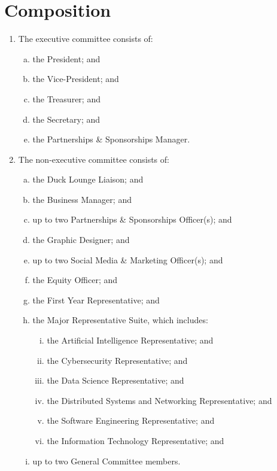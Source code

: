 \documentclass{schedule}
\begin{document}
\section{Composition}\label{composition}
\begin{enumerate}[(1)]
    \item The executive committee consists of:
          \begin{enumerate}[(a)]
              \item the President; and
              \item the Vice-President; and
              \item the Treasurer; and
              \item the Secretary; and
              \item the Partnerships \& Sponsorships Manager.
          \end{enumerate}
    \item The non-executive committee consists of:
          \begin{enumerate}[(a)]
              \item the Duck Lounge Liaison; and
              \item the Business Manager; and
              \item up to two Partnerships \& Sponsorships Officer(s); and
              \item the Graphic Designer; and
              \item up to two Social Media \& Marketing Officer(s); and
              \item the Equity Officer; and
              \item the First Year Representative; and
              \item the Major Representative Suite, which includes:
                    \begin{enumerate}[(i)]
                        \item the Artificial Intelligence Representative; and
                        \item the Cybersecurity Representative; and
                        \item the Data Science Representative; and
                        \item the Distributed Systems and Networking Representative; and
                        \item the Software Engineering Representative; and
                        \item the Information Technology Representative; and
                    \end{enumerate}
              \item up to two General Committee members.
          \end{enumerate}
\end{enumerate}
\end{document}
